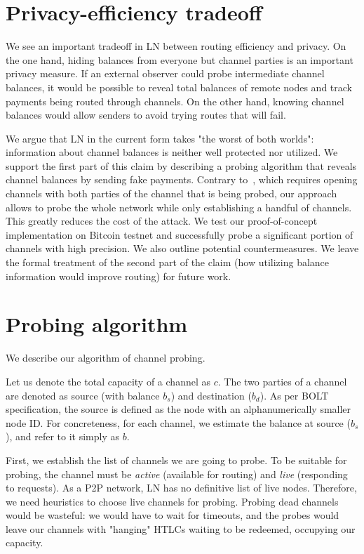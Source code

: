 \section{Privacy-efficiency tradeoff}
We see an important tradeoff in LN between routing efficiency and privacy.
On the one hand, hiding balances from everyone but channel parties is an important privacy measure.
If an external observer could probe intermediate channel balances, it would be possible to reveal total balances of remote nodes and track payments being routed through channels.
On the other hand, knowing channel balances would allow senders to avoid trying routes that will fail.

We argue that LN in the current form takes "the worst of both worlds": information about channel balances is neither well protected nor utilized.
We support the first part of this claim by describing a probing algorithm that reveals channel balances by sending fake payments.
Contrary to~\cite{Dam2019}, which requires opening channels with both parties of the channel that is being probed, our approach allows to probe the whole network while only establishing a handful of channels.
This greatly reduces the cost of the attack.
We test our proof-of-concept implementation on Bitcoin testnet and successfully probe a significant portion of channels with high precision.
We also outline potential countermeasures.
We leave the formal treatment of the second part of the claim (how utilizing balance information would improve routing) for future work.


\section{Probing algorithm} \label{sec:probing}
We describe our algorithm of channel probing.

Let us denote the total capacity of a channel as $c$.
The two parties of a channel are denoted as source (with balance $b_s$) and destination ($b_d$).
As per BOLT specification, the source is defined as the node with an alphanumerically smaller node ID.
For concreteness, for each channel, we estimate the balance at source ($b_s$), and refer to it simply as $b$.

First, we establish the list of channels we are going to probe.
To be suitable for probing, the channel must be \textit{active} (available for routing) and \textit{live} (responding to requests).
As a P2P network, LN has no definitive list of live nodes.
Therefore, we need heuristics to choose live channels for probing. 
Probing dead channels would be wasteful: we would have to wait for timeouts, and the probes would leave our channels with "hanging" HTLCs waiting to be redeemed, occupying our capacity.

